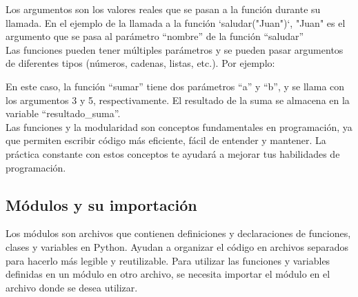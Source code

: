 Los argumentos son los valores reales que se pasan a la función durante su llamada. En el ejemplo de la llamada a la función `saludar("Juan")`, "Juan" es el argumento que se pasa al parámetro ``nombre'' de la función ``saludar''\\

Las funciones pueden tener múltiples parámetros y se pueden pasar argumentos de diferentes tipos (números, cadenas, listas, etc.). Por ejemplo:

\newpage

\begin{figure}[h]
    \centering
  \end{figure}

En este caso, la función ``sumar'' tiene dos parámetros ``a'' y ``b'', y se llama con los argumentos 3 y 5, respectivamente. El resultado de la suma se almacena en la variable ``resultado\_suma''.\\

Las funciones y la modularidad son conceptos fundamentales en programación, ya que permiten escribir código más eficiente, fácil de entender y mantener. La práctica constante con estos conceptos te ayudará a mejorar tus habilidades de programación.

\subsection{Módulos y su importación}
Los módulos son archivos que contienen definiciones y declaraciones de funciones, clases y variables en Python. Ayudan a organizar el código en archivos separados para hacerlo más legible y reutilizable. Para utilizar las funciones y variables definidas en un módulo en otro archivo, se necesita importar el módulo en el archivo donde se desea utilizar.

